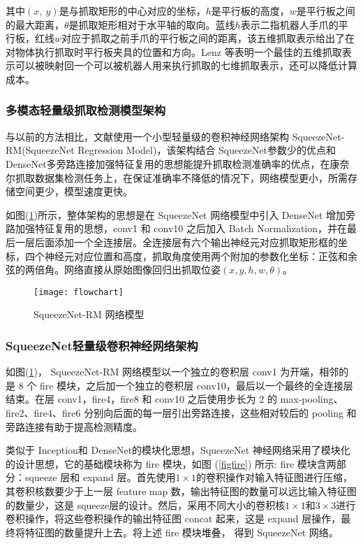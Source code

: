 \documentclass[no-math, withoutpreface]{YangThesis}
\begin{document}
其中$(x,\ y)$是与抓取矩形的中心对应的坐标，$h$是平行板的高度，$w$是平行板之间的最大距离，$\theta$是抓取矩形相对于水平轴的取向。蓝线$h$表示二指机器人手爪的平行板，红线$w$对应于抓取之前手爪的平行板之间的距离，该五维抓取表示给出了在对物体执行抓取时平行板夹具的位置和方向。Lenz 等表明一个最佳的五维抓取表示可以被映射回一个可以被机器人用来执行抓取的七维抓取表示，还可以降低计算成本。

\subsubsection{多模态轻量级抓取检测模型架构}

与以前的方法\cite{bib3,bib4,bib5}相比，文献\cite{bib:one}使用一个小型轻量级的卷积神经网络架构 SqueezeNet-RM(SqueezeNet Regression Model)，该架构结合 SqueezeNet\cite{bib12}参数少的优点和 DenseNet\cite{bib13}多旁路连接加强特征复用的思想能提升抓取检测准确率的优点，在康奈尔抓取数据集检测任务上，在保证准确率不降低的情况下，网络模型更小，所需存储空间更少，模型速度更快。

如图(\ref{figflowchart})所示，整体架构的思想是在 SqueezeNet 网络模型中引入 DenseNet 增加旁路加强特征复用的思想，conv1 和 conv10 之后加入 Batch Normalization，并在最后一层后面添加一个全连接层。全连接层有六个输出神经元对应抓取矩形框的坐标，四个神经元对应位置和高度，抓取角度使用两个附加的参数化坐标：正弦和余弦的两倍角。网络直接从原始图像回归出抓取位姿$(x,y,h,w,\theta)$。

\begin{figure}[!htbp]
	\centering
	\texttt{[image: flowchart]}
	\caption{SqueezeNet-RM 网络模型}
     \label{figflowchart}
\end{figure}

\subsubsection{SqueezeNet轻量级卷积神经网络架构}

如图(\ref{figflowchart})， SqueezeNet-RM 网络模型以一个独立的卷积层 conv1 为开端，相邻的是 8 个 f\/ire 模块，之后加一个独立的卷积层 conv10，最后以一个最终的全连接层结束。在层 conv1，f\/ire4，f\/ire8 和 conv10 之后使用步长为 2 的 max-pooling、f\/ire2、f\/ire4、f\/ire6 分别向后面的每一层引出旁路连接，这些相对较后的 pooling 和旁路连接有助于提高检测精度。 

类似于 Inception\cite{bib14}和 DenseNet\cite{bib15}的模块化思想，SqueezeNet 神经网络采用了模块化的设计思想，它的基础模块称为 f\/ire 模块，如图 (\ref{figfire}) 所示:  f\/ire 模块含两部分：squeeze 层和 expand 层。首先使用$1\times1$的卷积操作对输入特征图进行压缩，其卷积核数要少于上一层 feature map 数，输出特征图的数量可以远比输入特征图的数量少，这是 squeeze层的设计。然后，采用不同大小的卷积核$1\times1$和$3\times3$进行卷积操作，将这些卷积操作的输出特征图 concat 起来，这是 expand 层操作，最终将特征图的数量提升上去。将上述 f\/ire 模块堆叠， 得到 SqueezeNet 网络。
\end{document}
